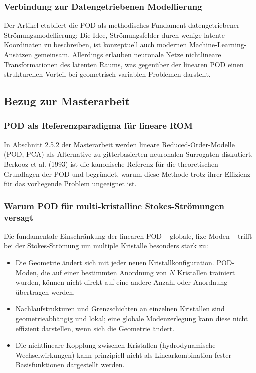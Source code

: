 \documentclass[a4paper,12pt]{article}
\begin{document}
\subsubsection*{Verbindung zur Datengetriebenen Modellierung}

Der Artikel etabliert die POD als methodisches Fundament datengetriebener Strömungsmodellierung: Die Idee, Strömungsfelder durch wenige latente Koordinaten zu beschreiben, ist konzeptuell auch modernen Machine-Learning-Ansätzen gemeinsam. Allerdings erlauben neuronale Netze nichtlineare Transformationen des latenten Raums, was gegenüber der linearen POD einen strukturellen Vorteil bei geometrisch variablen Problemen darstellt.

\subsection*{Bezug zur Masterarbeit}

\subsubsection*{POD als Referenzparadigma für lineare ROM}

In Abschnitt 2.5.2 der Masterarbeit werden lineare Reduced-Order-Modelle (POD, PCA) als Alternative zu gitterbasierten neuronalen Surrogaten diskutiert. Berkooz et al. (1993) ist die kanonische Referenz für die theoretischen Grundlagen der POD und begründet, warum diese Methode trotz ihrer Effizienz für das vorliegende Problem ungeeignet ist.

\subsubsection*{Warum POD für multi-kristalline Stokes-Strömungen versagt}

Die fundamentale Einschränkung der linearen POD -- globale, fixe Moden -- trifft bei der Stokes-Strömung um multiple Kristalle besonders stark zu:
\begin{itemize}
    \item Die Geometrie ändert sich mit jeder neuen Kristallkonfiguration. POD-Moden, die auf einer bestimmten Anordnung von $N$ Kristallen trainiert wurden, können nicht direkt auf eine andere Anzahl oder Anordnung übertragen werden.
    \item Nachlaufstrukturen und Grenzschichten an einzelnen Kristallen sind geometrieabhängig und lokal; eine globale Modenzerlegung kann diese nicht effizient darstellen, wenn sich die Geometrie ändert.
    \item Die nichtlineare Kopplung zwischen Kristallen (hydrodynamische Wechselwirkungen) kann prinzipiell nicht als Linearkombination fester Basisfunktionen dargestellt werden.
\end{itemize}
\end{document}
